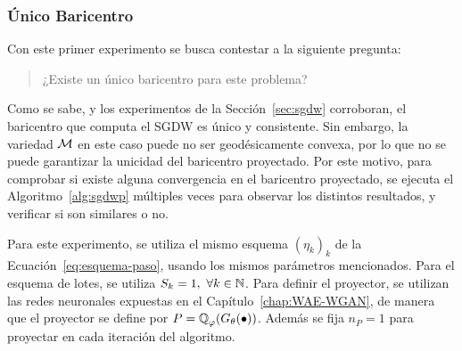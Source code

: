 \subsubsection{Único Baricentro}\label{sssec:sgdwp-unico-bar}  %


Con este primer experimento se busca contestar a la siguiente pregunta:
\begin{quotation}
    \centering
    ¿Existe un único baricentro para este problema?
\end{quotation}
Como se sabe, y los experimentos de la Sección~\ref{sec:sgdw} corroboran, el baricentro que computa el SGDW es único y consistente. Sin embargo, la variedad $\operatorname{\mathcal{M}}$ en este caso puede no ser geodésicamente convexa, por lo que no se puede garantizar la unicidad del baricentro proyectado. Por este motivo, para comprobar si existe alguna convergencia en el baricentro proyectado, se ejecuta el Algoritmo~\ref{alg:sgdwp} múltiples veces para observar los distintos resultados, y verificar si son similares o no.

Para este experimento, se utiliza el mismo esquema $(\eta_k)_k$ de la Ecuación~\ref{eq:esquema-paso}, usando los mismos parámetros mencionados. Para el esquema de lotes, se utiliza $S_k=1,\ \forall k \in \mathbb{N}$. Para definir el proyector, se utilizan las redes neuronales expuestas en el Capítulo~\ref{chap:WAE-WGAN}, de manera que el proyector se define por $P = \ProbQ_\varphi (G_\theta (\bullet))$. Además se fija $n_P=1$ para proyectar en cada iteración del algoritmo.

